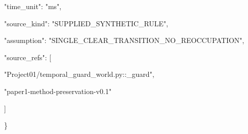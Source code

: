 \documentclass[nolineno]{ieeeaccess}
\begin{document}
{\begin{minipage}{\dimexpr\linewidth-2\fboxsep-2\fboxrule\relax}
\noindent{}\hspace{.4em}\parbox[t]{\dimexpr\linewidth-2em\relax}{\raggedright\ttfamily{}\fontsize{7.2}{9}\selectfont \hspace*{0.6em}"time\_\allowbreak unit": "ms",\allowbreak \strut}\par
\noindent{}\hspace{.4em}\parbox[t]{\dimexpr\linewidth-2em\relax}{\raggedright\ttfamily{}\fontsize{7.2}{9}\selectfont \hspace*{0.6em}"source\_\allowbreak kind": "SUPPLIED\_\allowbreak SYNTHETIC\_\allowbreak RULE",\allowbreak \strut}\par
\noindent{}\hspace{.4em}\parbox[t]{\dimexpr\linewidth-2em\relax}{\raggedright\ttfamily{}\fontsize{7.2}{9}\selectfont \hspace*{0.6em}"assumption": "SINGLE\_\allowbreak CLEAR\_\allowbreak TRANSITION\_\allowbreak NO\_\allowbreak REOCCUPATION",\allowbreak \strut}\par
\noindent{}\hspace{.4em}\parbox[t]{\dimexpr\linewidth-2em\relax}{\raggedright\ttfamily{}\fontsize{7.2}{9}\selectfont \hspace*{0.6em}"source\_\allowbreak refs": [\strut}\par
\noindent{}\hspace{.4em}\parbox[t]{\dimexpr\linewidth-2em\relax}{\raggedright\ttfamily{}\fontsize{7.2}{9}\selectfont \hspace*{1.2em}"Project01/temporal\_\allowbreak guard\_\allowbreak world.py::\_\allowbreak guard",\allowbreak \strut}\par
\noindent{}\hspace{.4em}\parbox[t]{\dimexpr\linewidth-2em\relax}{\raggedright\ttfamily{}\fontsize{7.2}{9}\selectfont \hspace*{1.2em}"paper1-method-preservation-v0.1"\strut}\par
\noindent{}\hspace{.4em}\parbox[t]{\dimexpr\linewidth-2em\relax}{\raggedright\ttfamily{}\fontsize{7.2}{9}\selectfont \hspace*{0.6em}]\strut}\par
\noindent{}\hspace{.4em}\parbox[t]{\dimexpr\linewidth-2em\relax}{\raggedright\ttfamily{}\fontsize{7.2}{9}\selectfont \hspace*{0.0em}\}\strut}\par
\end{minipage}}\par\smallskip
\end{document}
